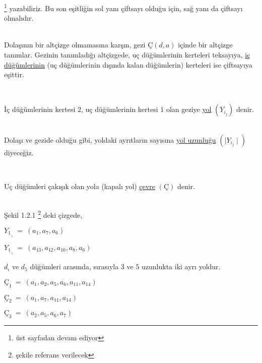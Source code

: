 \documentclass{article}
\begin{document}

\begin{tanit}           \footnote{üst sayfadan devam ediyor}
yazabiliriz. Bu son eşitliğin sol yanı çiftsayı olduğu için, sağ yanı da çiftsayı olmalıdır.
\end{tanit}

\\Dolaşının bir altçizge olmamasına karşın, gezi $Ç(d,a)$ içinde bir altçizge tanımlar. Gezinin tanımladığı altçizgede, uç düğümlerinin kerteleri teksayıya, \underline{iç düğümlerinin} (uç düğümlerinin dışında kalan düğümlerin) kerteleri ise çiftsayıya eşittir.

\\\begin{definition}
İç düğümlerinin kertesi $2$, uç düğümlerinin kertesi $1$ olan geziye \underline{yol} $(Y_i_j)$ denir.
\end{definition}

\\Dolaşı ve gezide olduğu gibi, yoldaki ayrıtların sayısına \underline{yol uzunluğu} $(\mid Y_i_j \mid)$ diyeceğiz.

\\\begin{definition}
Uç düğümleri çakışık olan yola (kapalı yol) \underline{çevre} $(Ç)$ denir.
\end{definition}

\\Şekil 1.2.1           \footnote{şekile referans verilecek} deki çizgede,

\qquad $Y_1_,_5\ =\ (a_1,a_7,a_6)$

\qquad $Y_1_,_5\ =\ (a_13,a_12,a_10,a_8,a_6)$

$d_ı$ ve $d_5$ düğümleri arasında, sırasıyla $3$ ve $5$ uzunlukta iki ayrı yoldur.

\qquad $Ç_1\ =\ (a_1,a_2,a_5,a_6,a_11,a_14)$

\qquad $Ç_2\ =\ (a_1,a_7,a_11,a_14)$

\qquad $Ç_3\ =\ (a_2,a_5,a_6,a_7)$
\end{document}
